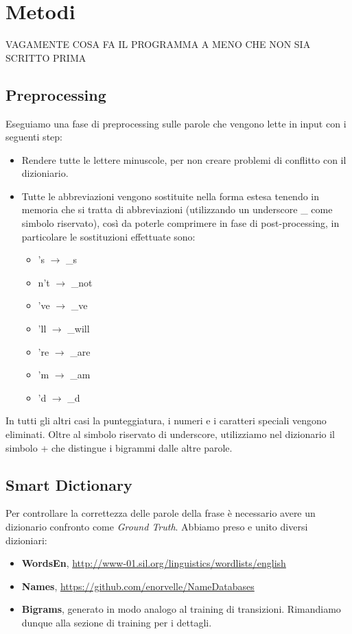 \section{Metodi}
VAGAMENTE COSA FA IL PROGRAMMA A MENO CHE NON SIA SCRITTO PRIMA

\subsection{Preprocessing}
\label{sec:preproc}
Eseguiamo una fase di preprocessing sulle parole che vengono lette
in input con i seguenti step:
\begin{itemize}
  \item Rendere tutte le lettere minuscole, per non creare problemi
  di conflitto con il dizioniario.
  \item Tutte le abbreviazioni vengono sostituite nella forma estesa
  tenendo in memoria che si tratta di abbreviazioni
   (utilizzando un underscore \_ come simbolo riservato), cos\`i da 
  poterle comprimere in fase di post-processing, in particolare le 
  sostituzioni effettuate sono:
  \begin{itemize}
    \item 's $\rightarrow$ \_s
    \item n't $\rightarrow$ \_not
    \item 've $\rightarrow$ \_ve
    \item 'll $\rightarrow$ \_will
    \item 're $\rightarrow$ \_are
    \item 'm $\rightarrow$ \_am
    \item 'd $\rightarrow$ \_d
  \end{itemize}
\end{itemize}
In tutti gli altri casi la punteggiatura, i numeri e i caratteri
speciali vengono eliminati. Oltre al simbolo riservato di underscore,
utilizziamo nel dizionario il simbolo + che distingue i bigrammi 
dalle altre parole.
\subsection{Smart Dictionary}

Per controllare la correttezza delle parole della frase \`e necessario
avere un dizionario confronto come \textit{Ground Truth}. 
Abbiamo preso e unito diversi dizioniari:
\begin{itemize}
  \item \textbf{WordsEn}, \url{http://www-01.sil.org/linguistics/wordlists/english}
  \item \textbf{Names}, \url{https://github.com/enorvelle/NameDatabases}
  \item \textbf{Bigrams}, generato in modo analogo al training di transizioni. Rimandiamo dunque alla sezione di training per i 
      dettagli.
\end{itemize}

